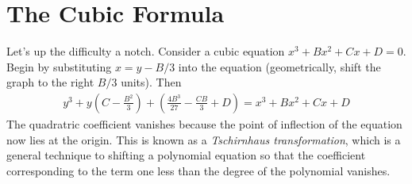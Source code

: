 %
%
%
%


\section{The Cubic Formula}

Let's up the difficulty a notch. Consider a cubic equation $x^3 + Bx^2 + Cx + D = 0$. Begin by substituting $x = y - B/3$ into the equation (geometrically, shift the graph to the right $B/3$ units). Then
%
\begin{align*}
   y^3 + y\left(C - \frac{B^2}{3}\right) + \left( \frac{4B^3}{27} - \frac{CB}{3} + D \right) = x^3 + Bx^2 + Cx + D
\end{align*}
%
The quadratric coefficient vanishes because the point of inflection of the equation now lies at the origin. This is known as a \emph{Tschirnhaus transformation}, which is a general technique to shifting a polynomial equation so that the coefficient corresponding to the term one less than the degree of the polynomial vanishes.

